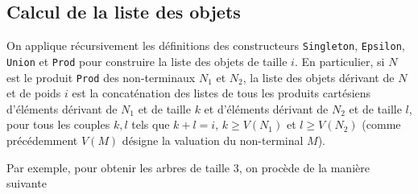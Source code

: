 \documentclass[11pt]{article}
\begin{document}
\subsection{Calcul de la liste des objets}

On applique récursivement les définitions des constructeurs
\texttt{Singleton}, \texttt{Epsilon}, \texttt{Union} et \texttt{Prod} pour
construire la liste des objets de taille $i$. En particulier, si $N$ est le
produit \texttt{Prod} des non-terminaux $N_1$ et $N_2$, la liste des objets
dérivant de $N$ et de poids $i$ est la concaténation des listes de tous les
produits cartésiens d'éléments dérivant de $N_1$ et de taille $k$ et
d'éléments dérivant de $N_2$ et de taille $l$, pour tous les couples $k,l$
tels que $k+l=i$, $k \geq V(N_1)$ et $l \geq V(N_2)$ (comme précédemment
$V(M)$ désigne la valuation du non-terminal $M$).

Par exemple, pour obtenir les arbres de taille $3$, on procède de la manière
suivante
\end{document}

